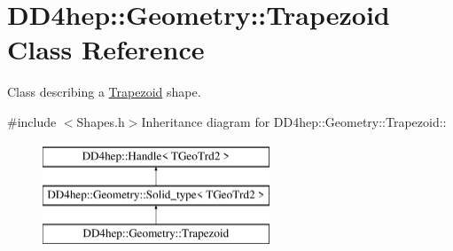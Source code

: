 \hypertarget{class_d_d4hep_1_1_geometry_1_1_trapezoid}{
\section{DD4hep::Geometry::Trapezoid Class Reference}
\label{class_d_d4hep_1_1_geometry_1_1_trapezoid}
}


Class describing a \hyperlink{class_d_d4hep_1_1_geometry_1_1_trapezoid}{Trapezoid} shape.  


{\ttfamily \#include $<$Shapes.h$>$}Inheritance diagram for DD4hep::Geometry::Trapezoid::\begin{figure}[H]
\begin{center}
\leavevmode
\includegraphics[height=3cm]{class_d_d4hep_1_1_geometry_1_1_trapezoid}
\end{center}
\end{figure}
